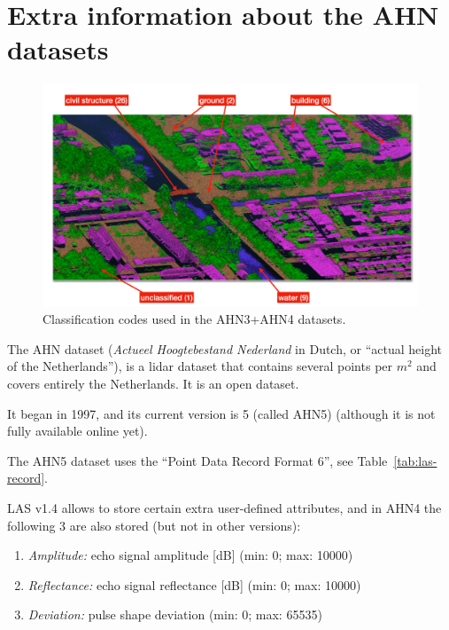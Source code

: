 
\graphicspath{{appendices/ahn/figs/}}

\chapter{Extra information about the AHN datasets}%
\label{app:ahn}


\begin{figure}
  \includegraphics[width=\linewidth]{ahn4.png}
  \caption{Classification codes used in the AHN3+AHN4 datasets.}%
\label{fig:ahn3}
\end{figure}

The AHN dataset (\emph{Actueel Hoogtebestand Nederland} in Dutch, or ``actual height of the Netherlands''), 
is a lidar dataset that contains several points per $m^2$ and covers entirely the Netherlands.
It is an open dataset.

It began in 1997, and its current version is 5 (called AHN5) (although it is not fully available online yet).

The AHN5 dataset uses the ``Point Data Record Format 6'', see Table~\ref{tab:las-record}.

LAS v1.4 allows to store certain extra user-defined attributes, and in AHN4 the following 3 are also stored (but not in other versions):
\begin{enumerate}
  \item \emph{Amplitude:} echo signal amplitude [dB] (min: 0; max: 10000) 
  \item \emph{Reflectance:} echo signal reflectance [dB] (min: 0; max: 10000)
  \item \emph{Deviation:} pulse shape deviation (min: 0; max: 65535)
\end{enumerate}

